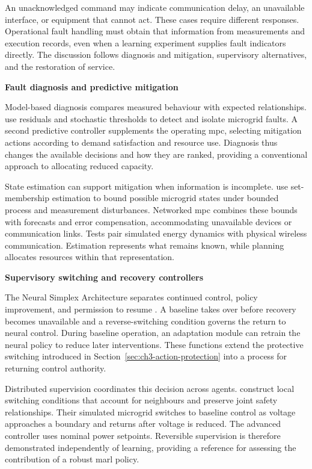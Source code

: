 An unacknowledged command may indicate communication delay, an unavailable interface, or equipment that cannot act. These cases require different responses. Operational fault handling must obtain that information from measurements and execution records, even when a learning experiment supplies fault indicators directly. The discussion follows diagnosis and mitigation, supervisory alternatives, and the restoration of service.

\smallskip
\noindent\textbf{Fault diagnosis and predictive mitigation}\par\nobreak\smallskip
Model-based diagnosis compares measured behaviour with expected relationships. \textcite{zafra2023fault} use residuals and stochastic thresholds to detect and isolate microgrid faults. A second predictive controller supplements the operating \gls{mpc}, selecting mitigation actions according to demand satisfaction and resource use. Diagnosis thus changes the available decisions and how they are ranked, providing a conventional approach to allocating reduced capacity.

State estimation can support mitigation when information is incomplete. \textcite{qiu2021set} use set-membership estimation to bound possible microgrid states under bounded process and measurement disturbances. Networked \gls{mpc} combines these bounds with forecasts and error compensation, accommodating unavailable devices or communication links. Tests pair simulated energy dynamics with physical wireless communication. Estimation represents what remains known, while planning allocates resources within that representation.

\smallskip
\noindent\textbf{Supervisory switching and recovery controllers}\par\nobreak\smallskip
The Neural Simplex Architecture separates continued control, policy improvement, and permission to resume \parencite{phan2020neuralsimplex}. A baseline takes over before recovery becomes unavailable and a reverse-switching condition governs the return to neural control. During baseline operation, an adaptation module can retrain the neural policy to reduce later interventions. These functions extend the protective switching introduced in Section~\ref{sec:ch3-action-protection} into a process for returning control authority.

Distributed supervision coordinates this decision across agents. \textcite{mehmood2021distributed} construct local switching conditions that account for neighbours and preserve joint safety relationships. Their simulated microgrid switches to baseline control as voltage approaches a boundary and returns after voltage is reduced. The advanced controller uses nominal power setpoints. Reversible supervision is therefore demonstrated independently of learning, providing a reference for assessing the contribution of a robust \gls{marl} policy.

